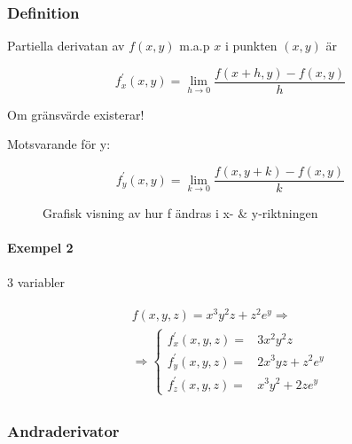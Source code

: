 \documentclass{article}
\begin{document}
\subsubsection{Definition}

Partiella derivatan av \(f(x,y)\) m.a.p \(x\) i punkten \((x,y)\) är

\[
	f^{\prime}_{x}(x,y) = \lim_{h \rightarrow 0} \frac{f(x+h,y) - f(x,y)}{h}
\]

Om gränsvärde existerar! \newline

Motsvarande för y:

\[
	f^{\prime}_{y}(x,y) = \lim_{k \rightarrow 0} \frac{f(x,y+k) - f(x,y)}{k}
\]

\begin{figure}[ht] 
  \caption{Grafisk visning av hur f ändras i x- \& y-riktningen} \label{fig:5}
\end{figure}

\paragraph{Exempel 2}

3 variabler

\begin{align*}
\begin{split}
	f(x,y,z) = x^3y^2z+z^2e^y \Rightarrow \\
	\Rightarrow \left\{\begin{array}{rcl}
		f_{x}^{\prime}(x,y,z) = & 3x^2y^2z \\
		f_{y}^{\prime}(x,y,z) = & 2x^3yz+z^2e^y \\
		f_{z}^{\prime}(x,y,z) = & x^3y^2+2ze^y
	\end{array}\right.
\end{split}
\end{align*}

\subsubsection{Andraderivator}
\end{document}
